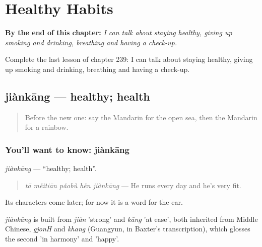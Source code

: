 
\chapter{Healthy Habits}
\label{ch:zh-healthy-habits}

\begin{chapteropening}
\textbf{By the end of this chapter:} \emph{I can talk about staying healthy, giving up smoking and drinking, breathing and having a check-up.}

Complete the last lesson of chapter 239: I can talk about staying healthy, giving up smoking and drinking, breathing and having a check-up.
\end{chapteropening}

\section[jiànkāng]{jiànkāng — healthy; health}

\label{lesson:ZH-C239-jiankang}



\begin{quote}
Before the new one: say the Mandarin for the open sea, then the Mandarin for a rainbow.
\end{quote}

\subsection*{You'll want to know: jiànkāng}
\emph{jiànkāng} — \textquotedblleft{}healthy; health\textquotedblright{}.

\begin{quote}
\emph{tā měitiān pǎobù hěn jiànkāng} — He runs every day and he's very fit.
\end{quote}

Its characters come later; for now it is a word for the ear.

\begin{cousinweb}
\emph{jiànkāng} is built from \emph{jiàn} 'strong' and \emph{kāng} 'at ease', both inherited from Middle Chinese, \emph{gjonH} and \emph{khang} (Guangyun, in Baxter's transcription), which glosses the second 'in harmony' and 'happy'.
\end{cousinweb}

